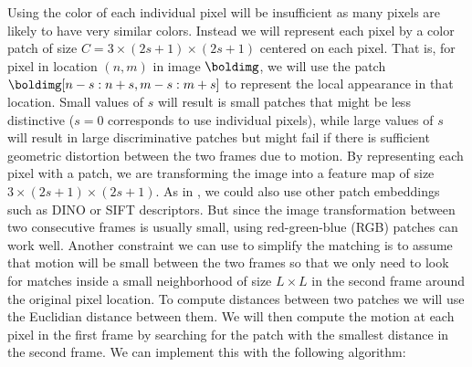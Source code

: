 Using the color of each individual pixel will be insufficient as many pixels are likely to have very similar colors. Instead we will represent each pixel by a color patch of size $C=3\times(2s+1)\times(2s+1)$ centered on each pixel. That is, for pixel in location $(n,m)$ in image $\boldimg$, we will use the patch $\boldimg [n-s:n+s, m-s:m+s]$ to represent the local appearance in that location. Small values of $s$ will result is small patches that might be less distinctive ($s=0$ corresponds to use individual pixels), while large values of $s$ will result in large discriminative patches but  might fail if there is sufficient geometric distortion between the two frames due to motion. By representing each pixel with a patch, we are transforming the image into a feature map of size $3\times(2s+1)\times(2s+1)$. As in \chap{\ref{chapter:perceptual_organization}}, we could also use other patch embeddings such as DINO or SIFT descriptors. But since the image transformation between two consecutive frames is usually small, using red-green-blue (RGB) patches can work well. Another constraint we can use to simplify the matching is to assume that motion will be small between the two frames so that we only need to look for matches inside a small neighborhood of size $L \times L$ in the second frame around the original pixel location. To compute distances between two patches we will use the Euclidian distance between them. We will then compute the motion at each pixel in the first frame by searching for the patch with the smallest distance in the second frame. We can implement this with the following algorithm: 

